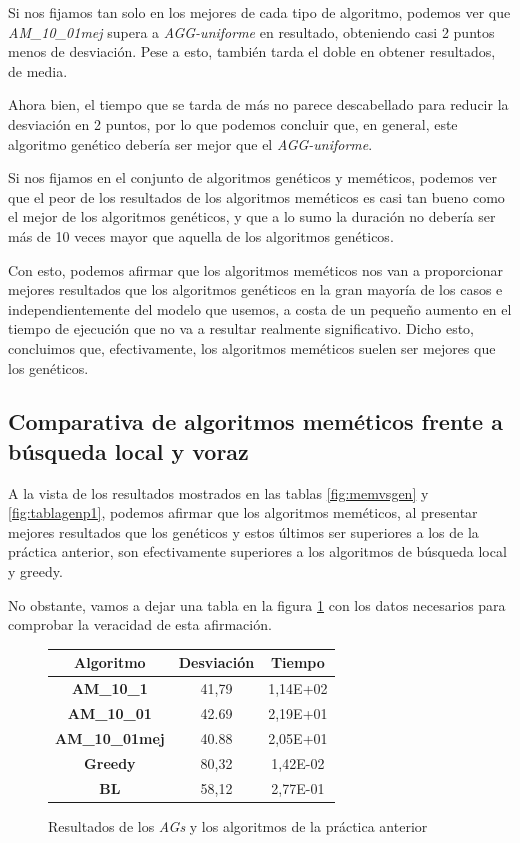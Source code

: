 Si nos fijamos tan solo en los mejores de cada tipo de algoritmo, podemos ver que \textit{AM\_10\_01mej} supera a \textit{AGG-uniforme} en resultado, obteniendo casi 2 puntos menos de desviación. Pese a esto, también tarda el doble en obtener resultados, de media.

Ahora bien, el tiempo que se tarda de más no parece descabellado para reducir la desviación en 2 puntos, por lo que podemos concluir que, en general, este algoritmo genético debería ser mejor que el \textit{AGG-uniforme}.

Si nos fijamos en el conjunto de algoritmos genéticos y meméticos, podemos ver que el peor de los resultados de los algoritmos meméticos es casi tan bueno como el mejor de los algoritmos genéticos, y que a lo sumo la duración no debería ser más de 10 veces mayor que aquella de los algoritmos genéticos.

Con esto, podemos afirmar que los algoritmos meméticos nos van a proporcionar mejores resultados que los algoritmos genéticos en la gran mayoría de los casos e independientemente del modelo que usemos, a costa de un pequeño aumento en el tiempo de ejecución que no va a resultar realmente significativo. Dicho esto, concluimos que, efectivamente, los algoritmos meméticos suelen ser mejores que los genéticos.

\subsection{Comparativa de algoritmos meméticos frente a búsqueda local y voraz}

A la vista de los resultados mostrados en las tablas \ref{fig:memvsgen} y \ref{fig:tablagenp1}, podemos afirmar que los algoritmos meméticos, al presentar mejores resultados que los genéticos y estos últimos ser superiores a los de la práctica anterior, son efectivamente superiores a los algoritmos de búsqueda local y greedy.

No obstante, vamos a dejar una tabla en la figura \ref{fig:tablamemp1} con los datos necesarios para comprobar la veracidad de esta afirmación.

\begin{figure}[H]
    \centering
    \begin{tabular}{|c|c|c|}
        \hline
        Algoritmo & \textbf{Desviación} & \textbf{Tiempo}\\
        \hline
        \textbf{AM\_10\_1} & 41,79 & 1,14E+02\\
        \hline
        \textbf{AM\_10\_01} & 42.69 & 2,19E+01\\
        \hline
        \textbf{AM\_10\_01mej} & 40.88 & 2,05E+01\\
        \hline
        \textbf{Greedy} & 80,32 & 1,42E-02\\
        \hline
        \textbf{BL} & 58,12 & 2,77E-01\\
        \hline
    \end{tabular}
    \caption{Resultados de los \textit{AGs} y los algoritmos de la práctica anterior}
    \label{fig:tablamemp1}
\end{figure}


